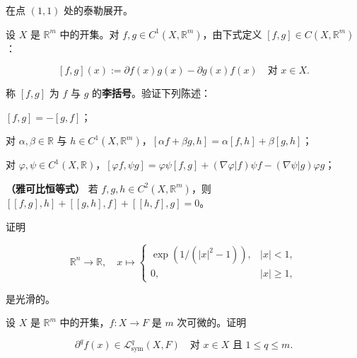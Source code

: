 \begin{exercises}
在点 $ (1, 1) $ 处的泰勒展开。

\item

设 $ X $ 是 $ \mathbb{R}^{m} $ 中的开集。对 $ f, g \in C^{1}(X, \mathbb{R}^{m}) $，由下式定义 $ [f, g] \in C(X, \mathbb{R}^{m}) $：

\[
[f, g](x) := \partial f(x)g(x) - \partial g(x)f(x) \quad \text{对 } x \in X .
\]

称 $ [f, g] $ 为 $ f $ 与 $ g $ 的\textbf{李括号}。验证下列陈述：

\begin{subitems}
\item

$ [f, g] = -[g, f] $；

\item

对 $ \alpha, \beta \in \mathbb{R} $ 与 $ h \in C^{1}(X, \mathbb{R}^{m}) $，$ [\alpha f + \beta g, h] = \alpha[f, h] + \beta[g, h] $；

\item

对 $ \varphi, \psi \in C^{1}(X, \mathbb{R}) $，$ [\varphi f, \psi g] = \varphi\psi[f, g] + (\nabla\varphi|f)\psi f - (\nabla\psi|g)\varphi g $；

\item

\textbf{（雅可比恒等式）} 若 $ f, g, h \in C^{2}(X, \mathbb{R}^{m}) $，则 $ [[f, g], h] + [[g, h], f] + [[h, f], g] = 0 $。

\end{subitems}

\item

证明

\begin{equation*}
\mathbb{R}^{n} \to \mathbb{R} , \quad x \mapsto \begin{cases} \exp\left( 1/(|x|^{2} - 1) \right) , & |x| < 1 , \\ 0 , & |x| \ge 1 , \end{cases}
\end{equation*}

是光滑的。

\item

设 $ X $ 是 $ \mathbb{R}^{m} $ 中的开集，$ f : X \to F $ 是 $ m $ 次可微的。证明

\[
\partial^{q}f(x) \in \mathcal{L}_{\mathrm{sym}}^{q}(X, F) \quad \text{对 } x \in X \text{ 且 } 1 \le q \le m .
\]


\end{exercises}
